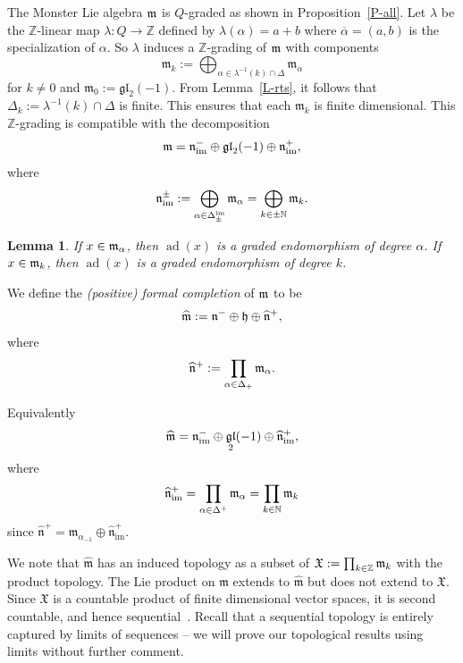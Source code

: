 \documentclass[11pt,letterpaper]{amsart}
\newcounter{thecounter}
\numberwithin{thecounter}{section}
\newtheorem{lemma}[thecounter]{Lemma}
\theoremstyle{definition}
\DeclareMathOperator{\gl}{\mathfrak{gl}}
\DeclareMathOperator{\ad}{ad}
\DeclareMathOperator{\im}{{im}}
\renewcommand{\a}{\alpha}
\newcommand{\Z}{{\mathbb Z}}
\newcommand{\N}{{\mathbb N}}
\newcommand{\m}{{\mathfrak{m}}}
\newcommand{\nhp}{{\widehat{\mathfrak{n}}^+}}
\newcommand{\nm}{{\mathfrak{n}^-}}
\newcommand{\nimp}{{\mathfrak{n}_{\im}^+}}
\newcommand{\nhimp}{{\widehat{\mathfrak{n}}_{\im}^+}}
\newcommand{\nimm}{{\mathfrak{n}_{\im}^-}}
\newcommand{\nimpm}{{\mathfrak{n}_{\im}^\pm}}
\begin{document}
The Monster Lie algebra $\frak m$ is $Q$-graded as shown in Proposition~\ref{P-all}.
Let $\lambda$ be the $\Z$-linear map $\lambda: Q \to \Z$ defined by
$\lambda(\a)=a+b$ where $\overline{\a}=(a,b)$ is the specialization of $\a$.
So $\lambda$ induces a $\Z$-grading of $\frak m$ with components
$$\mathfrak{m}_k := \bigoplus_{\a\in\lambda^{-1}(k)\cap\Delta} {\mathfrak m}_{\a}$$
for $k\ne0$ and $\mathfrak{m}_0:=\mathfrak{gl}_2(-1)$.
From Lemma~\ref{L-rts}, it follows that $\Delta_k:= \lambda^{-1}(k)\cap\Delta$ is finite. This ensures that each $\mathfrak{m}_k$ is finite dimensional.
This $\Z$-grading is compatible with the decomposition
$$\frak m = \nimm \oplus \frak{gl}_2(-1)  \oplus \nimp,$$
where
$$\nimpm := \bigoplus_{\a\in\Delta^{\im}_\pm} \frak m_\a = \bigoplus_{k\in\pm\N} \frak m_k.$$

\begin{lemma} If $x\in\frak m_\a$, then $\ad(x)$ is a graded endomorphism of degree $\a$.
If~$x\in\frak m_k$, then $\ad(x)$ is a graded endomorphism of degree $k$.
\end{lemma}

We define the \emph{(positive) formal completion} of $\frak m$ to be
$$\widehat{\frak m} := \nm \oplus \frak{h} \oplus \nhp,$$
where
$$\widehat{\frak n}^+ := \prod_{\a\in\Delta_+} \frak m_\a.$$

Equivalently
$$\widehat{\frak m} = \nimm \oplus \gl_2(-1) \oplus \nhimp,$$ 
where
$$ \nhimp=  \prod_{\a\in\Delta^+} \frak m_{\a}= \prod_{k\in\N} \frak m_k$$ since $\nhp = \m_{\a_{-1}}\oplus \nhimp$.

We note that $\widehat{\mathfrak{m}}$ has an induced topology as a subset of 
$\mathfrak{X}:=\prod_{k\in\Z} \frak m_k$ with the product topology.
The Lie product on $\mathfrak{m}$ extends to  $\widehat{\mathfrak{m}}$ but does not extend to $\mathfrak{X}$.
Since $\mathfrak{X}$ is a countable product of finite dimensional vector spaces, it is second countable, 
and hence sequential~\cite{Munkres}.   
Recall that a sequential topology is entirely captured by limits of sequences -- we will prove our topological results using limits  without further comment.
\end{document}
